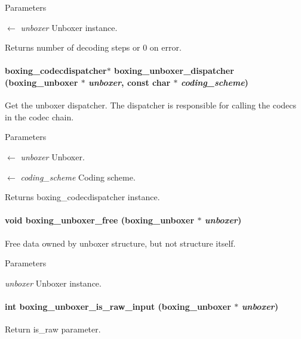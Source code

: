 \begin{DoxyParams}{Parameters}
\item[\mbox{$\leftarrow$} {\em unboxer}]Unboxer instance. \end{DoxyParams}
\begin{DoxyReturn}{Returns}
number of decoding steps or 0 on error. 
\end{DoxyReturn}
\hypertarget{group__unboxer_gacef2db1849f3d7e1e718cf8bdae2a302}{
\paragraph[{boxing\_\-unboxer\_\-dispatcher}]{\setlength{\rightskip}{0pt plus 5cm}boxing\_\-codecdispatcher$\ast$ boxing\_\-unboxer\_\-dispatcher (boxing\_\-unboxer $\ast$ {\em unboxer}, \/  const char $\ast$ {\em coding\_\-scheme})}\hfill}
\label{group__unboxer_gacef2db1849f3d7e1e718cf8bdae2a302}
Get the unboxer dispatcher. The dispatcher is responsible for calling the codecs in the codec chain.


\begin{DoxyParams}{Parameters}
\item[\mbox{$\leftarrow$} {\em unboxer}]Unboxer. \item[\mbox{$\leftarrow$} {\em coding\_\-scheme}]Coding scheme. \end{DoxyParams}
\begin{DoxyReturn}{Returns}
boxing\_\-codecdispatcher instance. 
\end{DoxyReturn}
\hypertarget{group__unboxer_ga754c1c3545803289577a78169af12ca0}{
\paragraph[{boxing\_\-unboxer\_\-free}]{\setlength{\rightskip}{0pt plus 5cm}void boxing\_\-unboxer\_\-free (boxing\_\-unboxer $\ast$ {\em unboxer})}\hfill}
\label{group__unboxer_ga754c1c3545803289577a78169af12ca0}
Free data owned by unboxer structure, but not structure itself.


\begin{DoxyParams}{Parameters}
\item[{\em unboxer}]Unboxer instance. \end{DoxyParams}
\hypertarget{group__unboxer_ga7b80bcde9d5f997789229978003439c7}{
\paragraph[{boxing\_\-unboxer\_\-is\_\-raw\_\-input}]{\setlength{\rightskip}{0pt plus 5cm}int boxing\_\-unboxer\_\-is\_\-raw\_\-input (boxing\_\-unboxer $\ast$ {\em unboxer})}\hfill}
\label{group__unboxer_ga7b80bcde9d5f997789229978003439c7}
Return is\_\-raw parameter.


